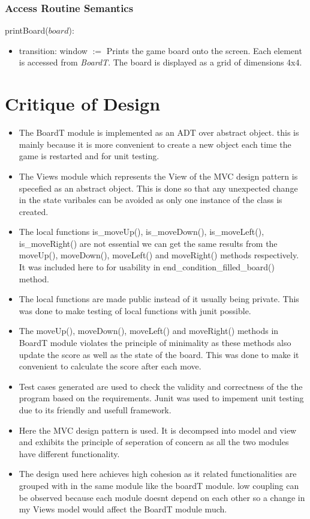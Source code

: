 \documentclass[12pt]{article}
\begin{document}
\subsubsection* {Access Routine Semantics}

\noindent printBoard($board$):
\begin{itemize}
\item transition: window $:=$ Prints the game board onto the screen. Each 
element is accessed from \textit{BoardT}. The board is displayed as a grid of dimensions 4x4.
\end{itemize}

\newpage


\section*{Critique of Design}

\begin{itemize}
  \item The BoardT module is implemented as an ADT over abstract object. this is mainly because it is more convenient to create a new object each time the game is restarted and for unit testing.
  \item The Views module which represents the View of the MVC design pattern is specefied as an abstract object. This is done so that any unexpected change in the state varibales 
	can be avoided as only one instance of the class is created.
  \item The local functions is\_moveUp(), is\_moveDown(), is\_moveLeft(), is\_moveRight() are not essential we can get the same results from the moveUp(), moveDown(), moveLeft() and 
	moveRight() methods respectively. It was included here to for usability in end\_condition\_filled\_board() method.
  \item The local functions are made public instead of it usually being private. This was done to make testing of local functions with junit possible.
  \item The moveUp(), moveDown(), moveLeft() and moveRight() methods in BoardT module violates the principle of minimality as these methods also update the score as well as the
	state of the board. This was done to make it convenient to calculate the score after each move. 
  \item Test cases generated are used to check the validity and correctness of the the program based on the requirements. Junit was used to impement unit testing due to its friendly and usefull
	framework.
  \item Here the MVC design pattern is used. It is decompsed into model and view and exhibits the principle of seperation of concern as all the two modules have different functionality.
  \item The design used here achieves high cohesion as it related functionalities are grouped with in the same module like the boardT module. low coupling can be observed because each 
	module doesnt depend on each other so a change in my Views model would affect the BoardT module much.
 
  
\end{itemize}
\end{document}
